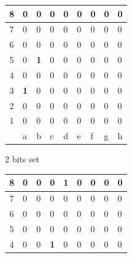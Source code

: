 \documentclass[12pt,a4paper,twoside,openright]{book}
\begin{document}
\begin{figure}[htpb]
\begin{subfigure}[b]{0.45\textwidth}
\centering
\begin{tabular}{|c|*{8}{>{\centering\arraybackslash}p{0.3cm}|}}
\hline
{\scriptsize 8} & \tiny 0 & \tiny 0 & \tiny 0 & \tiny 0 & \tiny 0 & \tiny 0 & \tiny 0 & \tiny 0 \\[2pt] \hline
{\scriptsize 7} & \tiny 0 & \tiny 0 & \tiny 0 & \tiny 0 & \tiny 0 & \tiny 0 & \tiny 0 & \tiny 0 \\[2pt] \hline
{\scriptsize 6} & \tiny 0 & \tiny 0 & \tiny 0 & \tiny 0 & \tiny 0 & \tiny 0 & \tiny 0 & \tiny 0 \\[2pt] \hline
{\scriptsize 5} & \tiny 0 & \tiny\textbf{1} & \tiny 0 & \tiny 0 & \tiny 0 & \tiny 0 & \tiny 0 & \tiny 0 \\[2pt] \hline
{\scriptsize 4} & \tiny 0 & \tiny 0 & \tiny 0 & \tiny 0 & \tiny 0 & \tiny 0 & \tiny 0 & \tiny 0 \\[2pt] \hline
{\scriptsize 3} & \tiny\textbf{1} & \tiny 0 & \tiny 0 & \cellcolor{lightgray}\tiny 0 & \tiny 0 & \tiny 0 & \tiny 0 & \tiny 0 \\[2pt] \hline
{\scriptsize 2} & \tiny 0 & \tiny 0 & \tiny 0 & \tiny 0 & \tiny 0 & \tiny 0 & \tiny 0 & \tiny 0 \\[2pt] \hline
{\scriptsize 1} & \tiny 0 & \tiny 0 & \tiny 0 & \tiny 0 & \tiny 0 & \tiny 0 & \tiny 0 & \tiny 0 \\[2pt] \hline
\multicolumn{1}{c|}{} & \scriptsize a & \scriptsize b & \scriptsize c & \scriptsize d & \scriptsize e & \scriptsize f & \scriptsize g & \scriptsize h \\
\cline{2-9}
\end{tabular}
\caption{2 bits set}
\end{subfigure}
\hfill
\begin{subfigure}[b]{0.45\textwidth}
\centering
\begin{tabular}{|c|*{8}{>{\centering\arraybackslash}p{0.3cm}|}}
\hline
{\scriptsize 8} & \tiny 0 & \tiny 0 & \tiny 0 & \tiny\textbf{1} & \tiny 0 & \tiny 0 & \tiny 0 & \tiny 0 \\[2pt] \hline
{\scriptsize 7} & \tiny 0 & \tiny 0 & \tiny 0 & \tiny 0 & \tiny 0 & \tiny 0 & \tiny 0 & \tiny 0 \\[2pt] \hline
{\scriptsize 6} & \tiny 0 & \tiny 0 & \tiny 0 & \tiny 0 & \tiny 0 & \tiny 0 & \tiny 0 & \tiny 0 \\[2pt] \hline
{\scriptsize 5} & \tiny 0 & \tiny 0 & \tiny 0 & \tiny 0 & \tiny 0 & \tiny 0 & \tiny 0 & \tiny 0 \\[2pt] \hline
{\scriptsize 4} & \tiny 0 & \tiny 0 & \tiny\textbf{1} & \tiny 0 & \tiny 0 & \tiny 0 & \tiny 0 & \tiny 0 \\[2pt] \hline

\end{tabular}
\end{subfigure}
\end{figure}
\end{document}
